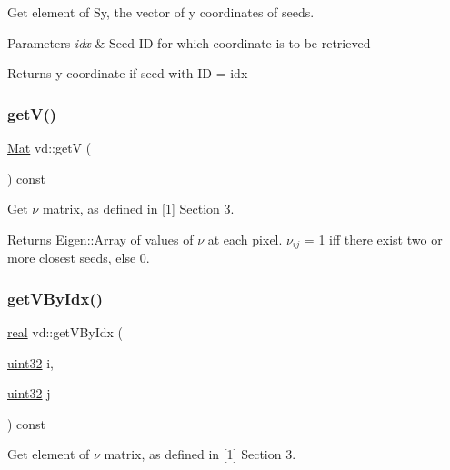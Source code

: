 Get element of Sy, the vector of y coordinates of seeds. 


\begin{DoxyParams}{Parameters}
{\em idx} & Seed ID for which coordinate is to be retrieved \\
\hline
\end{DoxyParams}
\begin{DoxyReturn}{Returns}
y coordinate if seed with ID = idx 
\end{DoxyReturn}
\mbox{\label{classvd_aad4ea5c045b8380f83b0490af2fee0fa}} 
\subsubsection{\texorpdfstring{get\+V()}{getV()}}
{\footnotesize\ttfamily \mbox{\hyperlink{typedefs_8h_a9fa28c1f74e909474857584f5c7b0088}{Mat}} vd\+::getV (\begin{DoxyParamCaption}{ }\end{DoxyParamCaption}) const}



Get $\nu$ matrix, as defined in \mbox{[}1\mbox{]} Section 3. 

\begin{DoxyReturn}{Returns}
Eigen\+::\+Array of values of $\nu$ at each pixel. $\nu_{ij}$ = 1 iff there exist two or more closest seeds, else 0. 
\end{DoxyReturn}
\mbox{\label{classvd_a640ed20e4618abd409e180a707eea3b1}} 
\subsubsection{\texorpdfstring{get\+V\+By\+Idx()}{getVByIdx()}}
{\footnotesize\ttfamily \mbox{\hyperlink{typedefs_8h_a58a0c7cf2501f4492da833421be92547}{real}} vd\+::get\+V\+By\+Idx (\begin{DoxyParamCaption}\item[{\mbox{\hyperlink{typedefs_8h_a8ad23e2333787a214e20a58a284a5a60}{uint32}}}]{i,  }\item[{\mbox{\hyperlink{typedefs_8h_a8ad23e2333787a214e20a58a284a5a60}{uint32}}}]{j }\end{DoxyParamCaption}) const}



Get element of $\nu$ matrix, as defined in \mbox{[}1\mbox{]} Section 3. 

